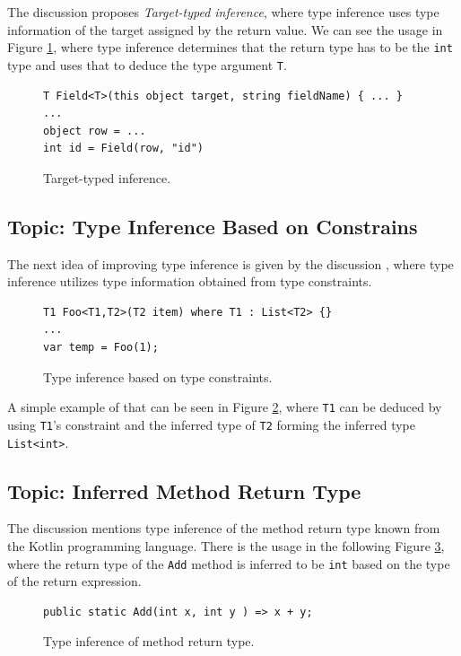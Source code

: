 The discussion \cite{online:RetTInference} proposes \textit{Target-typed inference}, where type inference uses type information of the target assigned by the return value. 
We can see the usage in Figure \ref{img62:RetTInf}, where type inference determines that the return type has to be the \texttt{int} type and uses that to deduce the type argument \texttt{T}.
\begin{figure}[h]
\begin{lstlisting}[style=csharp]
T Field<T>(this object target, string fieldName) { ... }
...
object row = ...
int id = Field(row, "id")
\end{lstlisting}
\caption{Target-typed inference.}
\label{img62:RetTInf}
\end{figure}

\subsection{Topic: Type Inference Based on Constrains} \label{sect11:is6}

The next idea of improving type inference is given by the discussion \cite{online:TInfConst}, where type inference utilizes type information obtained from type constraints.
\begin{figure}[h]
\begin{lstlisting}[style=csharp]
T1 Foo<T1,T2>(T2 item) where T1 : List<T2> {}
...
var temp = Foo(1);
\end{lstlisting}
\caption{Type inference based on type constraints.}
\label{img23:TInfConst}
\end{figure}
A simple example of that can be seen in Figure \ref{img23:TInfConst}, where \texttt{T1} can be deduced by using \texttt{T1}'s constraint and the inferred type of \texttt{T2} forming the inferred type \texttt{List<int>}.

\newpage

\subsection{Topic: Inferred Method Return Type} \label{sect12:is7}

The discussion \cite{online:TMRetInf} mentions type inference of the method return type known from the Kotlin programming language.
There is the usage in the following Figure \ref{img24:TMRetInf}, where the return type of the \texttt{Add} method is inferred to be \texttt{int} based on the type of the return expression.
\begin{figure}[h!]
\begin{lstlisting}[style=csharp]
public static Add(int x, int y ) => x + y;
\end{lstlisting}
\caption{Type inference of method return type.}
\label{img24:TMRetInf}
\end{figure}

